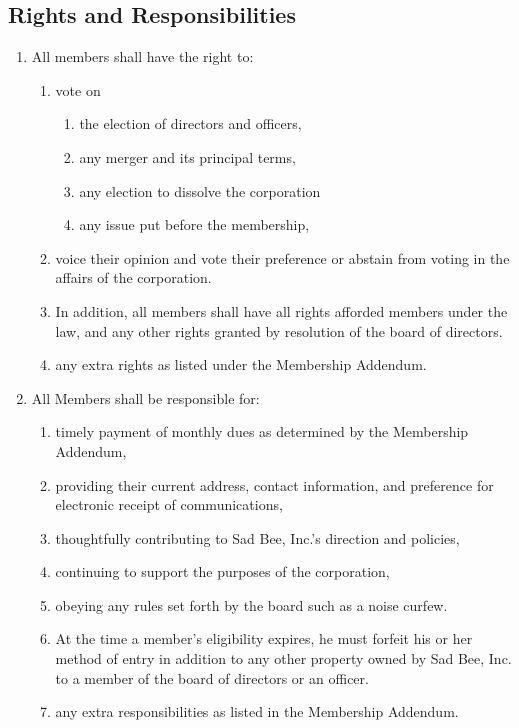 \documentclass{article}
\begin{document}
\subsection{Rights and Responsibilities}
\begin{enumerate}
    \item All members shall have the right to:
    \begin{enumerate}
        \item vote on
        \begin{enumerate}
            \item the election of directors and officers,
            \item any merger and its principal terms,
            \item any election to dissolve the corporation
            \item any issue put before the membership,
        \end{enumerate}
        \item voice their opinion and vote their preference or abstain from
        voting in the affairs of the corporation.
        \item In addition, all members shall have all rights afforded members
        under the law, and any other rights granted by resolution of the board
        of directors.
        \item any extra rights as listed under the Membership Addendum.
    \end{enumerate}
    \item All Members shall be responsible for:
    \begin{enumerate}
        \item timely payment of monthly dues as determined by the Membership
Addendum,
        \item providing their current address, contact information, and
        preference for electronic receipt of communications,
        \item thoughtfully contributing to Sad Bee, Inc.'s direction and
    policies,
        \item continuing to support the purposes of the corporation,
        \item obeying any rules set forth by the board such as a noise curfew.
        \item At the time a member’s eligibility expires, he must forfeit his or
    her method of entry in addition to any other property owned by Sad Bee, Inc.
    to a member of the board of directors or an officer.
        \item any extra responsibilities as listed in the Membership Addendum.
    \end{enumerate}
\end{enumerate}
\end{document}
